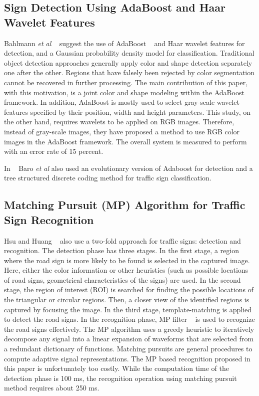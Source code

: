 \documentclass[review,number]{elsarticle}
\begin{document}
\subsection{Sign Detection Using AdaBoost and Haar Wavelet Features}
Bahlmann \textit{et al} ~\cite{Bahlmann05} suggest the use of AdaBoost ~\cite{miscbib13} and Haar wavelet \cite{miscbib14} features for detection, and a Gaussian probability density model for classification. Traditional object detection approaches generally apply color and shape detection separately one after the other. Regions that have falsely been rejected by color segmentation cannot be recovered in further processing. The main contribution of this paper, with this motivation, is a joint color and shape modeling within the AdaBoost framework. In addition, AdaBoost is mostly used to select gray-scale wavelet features specified by their position, width and height parameters. This study, on the other hand, requires wavelets to be applied on RGB images. Therefore, instead of gray-scale images, they have proposed a method to use RGB color images in the AdaBoost framework. The overall system is measured to perform with an error rate of 15 percent.

In ~\cite{baro09} Baro \textit{et al} also used an evolutionary version of Adaboost for detection and a tree structured discrete coding method for traffic sign classification.

\subsection{Matching Pursuit (MP) Algorithm for Traffic Sign Recognition}
Hsu and Huang ~\cite{signbib05} also use a two-fold approach for traffic signs: detection and recognition. The detection phase has three stages. In the first stage, a region where the road sign is more likely to be found is selected in the captured image. Here, either the color information or other heuristics (such as possible locations of road signs, geometrical characteristics of the signs) are used. In the second stage, the region of interest (ROI) is searched for finding the possible locations of the triangular or circular regions. Then, a closer view of the identified regions is captured by focusing the image. In the third stage, template-matching is applied to detect the road signs. In the recognition phase, MP filter ~\cite{signbib24} is used to recognize the road signs effectively. The MP algorithm uses a greedy heuristic to iteratively decompose any signal into a linear expansion of waveforms that are selected from a redundant dictionary of functions. Matching pursuits are general procedures to compute adaptive signal representations. The MP based recognition proposed in this paper is unfortunately too costly. While the computation time of the detection phase is 100 ms, the recognition operation using matching pursuit method requires about 250 ms.
\end{document}
